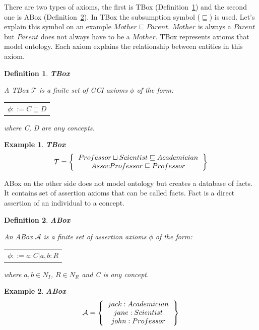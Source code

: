 \documentclass[12pt,a4paper]{article}
\newtheorem{definition}{Definition}[subsection]
\newtheorem{example}{Example}[subsection]
\begin{document}
There are two types of axioms, the first is TBox (Definition~\ref{def:tbox}) and the second one is ABox (Definition~\ref{def:abox}). In TBox the subsumption symbol ($\sqsubseteq$) is used. Let's explain this symbol on an example $Mother \sqsubseteq Parent$. $Mother$ is always a $Parent$ but $Parent$ does not always have to be a $Mother$. TBox represents axioms that model ontology. Each axiom explains the relationship between entities in this axiom.

\begin{definition}{\textbf{TBox}}
	\label{def:tbox}
	
	A TBox $\mathcal{T}$ is a finite set of GCI axioms $\phi$ of the form:
	
	\begin{table}[H]
		\centering
		\begin{tabular}{c}
			$ \phi ::= C \sqsubseteq D $
		\end{tabular}
	\end{table}
			
	where C, D are any concepts.
\end{definition}

\begin{example}{\textbf{TBox}}
	\[ 
	\mathcal{T} = \left\{
	\begin{tabular}{c c}
	$Professor \sqcup Scientist \sqsubseteq Academician$ \\
	$AssocProfessor \sqsubseteq Professor$ \\
	\end{tabular}
	\right \}
	\]
\end{example}

ABox on the other side does not model ontology but creates a database of facts. It contains set of assertion axioms that can be called facts. Fact is a direct assertion of an individual to a concept.

\begin{definition}{\textbf{ABox}}
	\label{def:abox}
	
    An ABox $\mathcal{A}$ is a finite set of assertion axioms $\phi$ of the form:
	\begin{table}[H]
		\centering
		\begin{tabular}{c}
			$ \phi ::= a:C | a,b:R $
		\end{tabular}
	\end{table}
	where $a,b \in N_{I}$, $R \in N_{R}$ and C is any concept.
\end{definition}

\begin{example}{\textbf{ABox}}
	\[ 
	\mathcal{A} = \left\{
	\begin{tabular}{c c}
	$jack : Academician$ \\
	$jane : Scientist$ \\
	$john : Professor$ \\
	\end{tabular}
	\right \}
	\]
\end{example}
\end{document}

